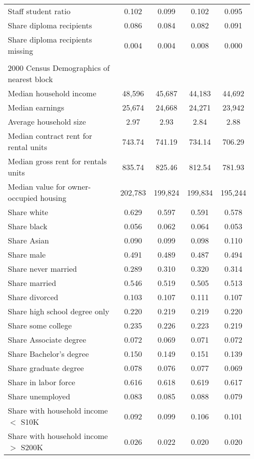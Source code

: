 \begin{center}
\begin{tabular}{lcccc}
Staff student ratio & 0.102 & 0.099 & 0.102 & 0.095\\
Share diploma recipients & 0.086 & 0.084 & 0.082 & 0.091\\
Share diploma recipients missing & 0.004 & 0.004 & 0.008 & 0.000\\
 &  &  &  & \\
2000 Census Demographics of nearest block &  &  &  & \\
Median household income  & 48,596 & 45,687 & 44,183 & 44,692\\
Median earnings  & 25,674 & 24,668 & 24,271 & 23,942\\
Average household size & 2.97 & 2.93 & 2.84 & 2.88\\
Median contract rent for rental units & 743.74 & 741.19 & 734.14 & 706.29\\
Median gross rent for rentals units & 835.74 & 825.46 & 812.54 & 781.93\\
Median value for owner-occupied housing & 202,783 & 199,824 & 199,834 & 195,244\\
Share white & 0.629 & 0.597 & 0.591 & 0.578\\
Share black & 0.056 & 0.062 & 0.064 & 0.053\\
Share Asian & 0.090 & 0.099 & 0.098 & 0.110\\
Share male & 0.491 & 0.489 & 0.487 & 0.494\\
Share never married & 0.289 & 0.310 & 0.320 & 0.314\\
Share married & 0.546 & 0.519 & 0.505 & 0.513\\
Share divorced & 0.103 & 0.107 & 0.111 & 0.107\\
Share high school degree only & 0.220 & 0.219 & 0.219 & 0.220\\
Share some college & 0.235 & 0.226 & 0.223 & 0.219\\
Share Associate degree & 0.072 & 0.069 & 0.071 & 0.072\\
Share Bachelor’s degree & 0.150 & 0.149 & 0.151 & 0.139\\
Share graduate degree & 0.078 & 0.076 & 0.077 & 0.069\\
Share in labor force & 0.616 & 0.618 & 0.619 & 0.617\\
Share unemployed & 0.083 & 0.085 & 0.088 & 0.079\\
Share with household income $ < $ S10K & 0.092 & 0.099 & 0.106 & 0.101\\
Share with household income $ > $ S200K & 0.026 & 0.022 & 0.020 & 0.020\\

\end{tabular}
\end{center}
